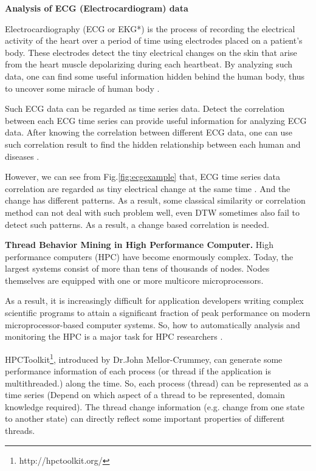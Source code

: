\textbf{Analysis of ECG (Electrocardiogram) data}

Electrocardiography \cite{holter1961new} (ECG or EKG*) 
is the process of recording the electrical activity of the heart over a period of time using electrodes placed on a patient's body. 
These electrodes detect the tiny electrical changes on the skin that arise from the heart muscle depolarizing during each heartbeat. 
By analyzing such data, one can find some useful information hidden behind the human body, thus to uncover some miracle of human body \cite{tilley1979essentials}.

Such ECG data can be regarded as time series data. Detect the correlation between each ECG time series can provide useful information for analyzing ECG data. 
After knowing the correlation between different ECG data, one can use such correlation result to find the hidden relationship between each human and diseases \cite{marriott1988practical}.

However, we can see from Fig.\ref{fig:ecgexample} that, ECG time series data correlation are regarded as tiny electrical change at the same time \cite{tilley1979essentials}. And the change has different patterns. As a result, some classical similarity or correlation method can not deal with such problem well, even DTW sometimes also fail to detect such patterns. As a result, a change based correlation is needed.


\textbf{Thread Behavior Mining in High Performance Computer.}
High performance computers (HPC) have become enormously complex. Today, the largest systems consist of more than tens of thousands of nodes. Nodes themselves are equipped with one or more multicore microprocessors\cite{adhianto2010hpctoolkit}. 

As a result, it is increasingly difficult for application developers writing complex scientific programs to attain a significant fraction of peak performance on modern microprocessor-based computer systems. 
So, how to automatically analysis and monitoring the HPC is a major task for HPC researchers \cite{mccurdy2010memphis,tallent2009effective}.

HPCToolkit\footnote{http://hpctoolkit.org/}, introduced by Dr.John Mellor-Crummey, can generate some performance information of each process (or thread if the application is multithreaded.) along the time. So, each process (thread) can be represented as a time series (Depend on which aspect of a thread to be represented, domain knowledge required). The thread change information (e.g. change from one state to another state) can directly reflect some important properties of different threads. 

